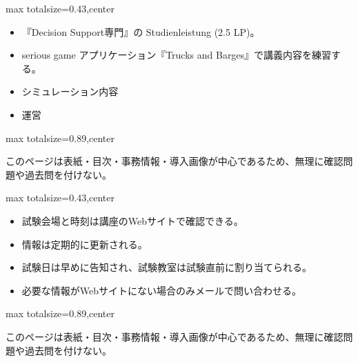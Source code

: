 \clearpage
{}
\begin{minipage}[t]{0.405\textwidth}
\begin{adjustbox}{max totalsize={\textwidth}{0.43\textheight},center}
\begin{minipage}{\textwidth}\scriptsize
{}\begin{itemize}
\item 『Decision Support専門』の Studienleistung (2.5 LP)。
\item serious game アプリケーション『Trucks and Barges』で講義内容を練習する。
\item シミュレーション内容
\item 運営
\end{itemize}
\end{minipage}
\end{adjustbox}
\end{minipage}\hfill
\begin{minipage}[t]{0.58\textwidth}
\begin{adjustbox}{max totalsize={\textwidth}{0.89\textheight},center}
\begin{minipage}{\textwidth}\scriptsize
{}このページは表紙・目次・事務情報・導入画像が中心であるため、無理に確認問題や過去問を付けない。
\end{minipage}
\end{adjustbox}
\end{minipage}


\clearpage
{}
\begin{minipage}[t]{0.405\textwidth}
\begin{adjustbox}{max totalsize={\textwidth}{0.43\textheight},center}
\begin{minipage}{\textwidth}\scriptsize
{}\begin{itemize}
\item 試験会場と時刻は講座のWebサイトで確認できる。
\item 情報は定期的に更新される。
\item 試験日は早めに告知され、試験教室は試験直前に割り当てられる。
\item 必要な情報がWebサイトにない場合のみメールで問い合わせる。
\end{itemize}
\end{minipage}
\end{adjustbox}
\end{minipage}\hfill
\begin{minipage}[t]{0.58\textwidth}
\begin{adjustbox}{max totalsize={\textwidth}{0.89\textheight},center}
\begin{minipage}{\textwidth}\scriptsize
{}このページは表紙・目次・事務情報・導入画像が中心であるため、無理に確認問題や過去問を付けない。
\end{minipage}
\end{adjustbox}
\end{minipage}


